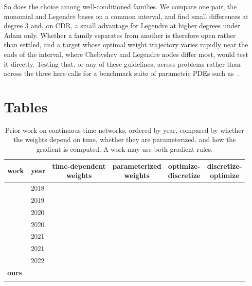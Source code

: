 \documentclass[pdflatex,sn-mathphys-num]{sn-jnl}%
\newcommand{\cmark}{\ding{51}}%
\newcommand{\xmark}{\ding{55}}%
\theoremstyle{thmstyleone}%
\theoremstyle{thmstyletwo}%
\theoremstyle{thmstylethree}%
\begin{document}
So does the choice among well-conditioned families. We compare one pair, the monomial and Legendre bases on a common interval, and find small differences at degree $3$ and, on CDR, a small advantage for Legendre at higher degrees under Adam only. Whether a family separates from another is therefore open rather than settled, and a target whose optimal weight trajectory varies rapidly near the ends of the interval, where Chebyshev and Legendre nodes differ most, would test it directly.
%
Testing that, or any of these guidelines, across problems rather than across the three here calls for a benchmark suite of parametric PDEs such as~\cite{takamoto2024pdebenchextensivebenchmarkscientific}.

\section{Tables}\label{sect:tables}


\begin{table}[!htb]
    \centering
    \caption{Prior work on continuous-time networks, ordered by year, compared by whether the
    weights depend on time, whether they are parameterized, and how the gradient is computed. A
    work may use both gradient rules.}\label{tab:literature}
    \begin{tabular}{llcccc}
        \toprule
        work & year & \makecell{time-dependent\\weights} & \makecell{parameterized\\weights}
              & \makecell{optimize-\\discretize} & \makecell{discretize-\\optimize} \\
        \midrule
        \citeauthor{ChenEtAl2018}~\cite{ChenEtAl2018} & 2018 & \xmark~& \xmark~& \cmark~& \xmark~\\
        \citeauthor{zhouNODES}~\cite{zhouNODES} & 2019 & \cmark~& \cmark~& \cmark~& \cmark~\\
        \citeauthor{autonomous}~\cite{autonomous} & 2020 & \cmark~& \cmark~& \cmark~& \xmark~\\
        \citeauthor{dissect}~\cite{dissect} & 2020 & \cmark~& \cmark~& \cmark~& \xmark~\\
        \citeauthor{gunther}~\cite{gunther} & 2021 & \cmark~& \cmark~& \xmark~& \cmark~\\
        \citeauthor{ott2021resnet}~\cite{ott2021resnet} & 2021 & \xmark~& \xmark~& \cmark~& \cmark~\\
        \citeauthor{generalized}~\cite{generalized} & 2022 & \cmark~& \cmark~& \xmark~& \cmark~\\
        \textbf{ours} & & \cmark~& \cmark~& \cmark~& \cmark~\\
        \botrule%
    \end{tabular}%
\end{table}
\end{document}

